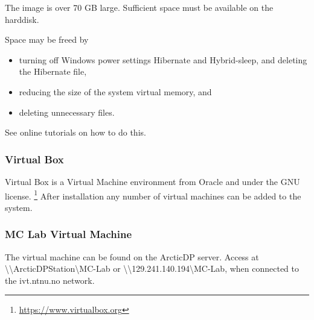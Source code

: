 \documentclass[a4paper,twoside,english]{report}
\begin{document}
The image is over 70 GB large. Sufficient space must be available
on the harddisk.

Space may be freed by
\begin{itemize}
\item turning off Windows power settings Hibernate and Hybrid-sleep, and
deleting the Hibernate file,
\item reducing the size of the system virtual memory, and
\item deleting unnecessary files.
\end{itemize}
See online tutorials on how to do this.

\subsubsection{Virtual Box}

Virtual Box is a Virtual Machine environment from Oracle and under
the GNU license. \footnote{\url{ https://www.virtualbox.org}} After
installation any number of virtual machines can be added to the system.

\subsubsection{MC Lab Virtual Machine}

The virtual machine can be found on the ArcticDP server. Access at
{\textbackslash{}\textbackslash{}ArcticDPStation\textbackslash{}MC-Lab}
or {\textbackslash{}\textbackslash{}129.241.140.194\textbackslash{}MC-Lab},
when connected to the ivt.ntnu.no network.
\end{document}
